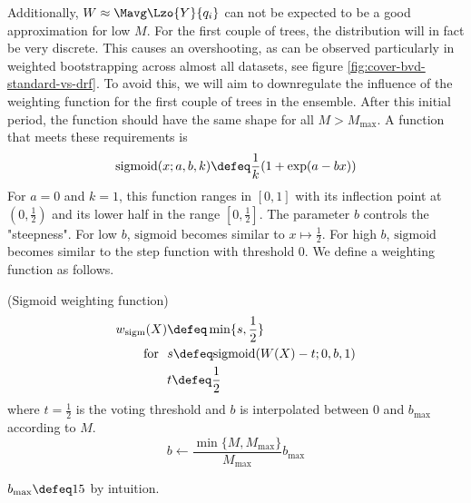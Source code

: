 \documentclass[../main.tex]{subfiles}
\begin{document}
Additionally, $W \approx \Mavg\Lzo{Y}{q_{i}}$ can not be expected to be a good approximation for low $M$. For the first couple of trees, the distribution will in fact be very discrete. This causes an overshooting, as can be observed particularly in weighted bootstrapping across almost all datasets, see figure \ref{fig:cover-bvd-standard-vs-drf}. To avoid this, we will aim to downregulate the influence of the weighting function for the first couple of trees in the ensemble. After this initial period, the function should have the same shape for all $M > M_{\text{max}}$.
A function that meets these requirements is
$$
\text{sigmoid}(x;a,b,k) \defeq \frac{1}{k} (1 + \exp(a-bx))
$$
For $a=0$ and $k=1$, this function ranges in $[0,1]$ with its inflection point at $(0, \frac{1}{2})$ and its lower half in the range $[0, \frac{1}{2}]$. The parameter $b$ controls the "steepness". For low $b$, $\text{sigmoid}$ becomes similar to $x \mapsto \frac{1}{2}$. For high $b$, $\text{sigmoid}$ becomes similar to the step function with threshold $0$.
We define a weighting function as follows.
\begin{definition} (Sigmoid weighting function)
\begin{align*}
w_{\text{sigm} }(X) &\defeq \min\{ s, \frac{1}{2} \} \\
\text{for}~ ~ & s \defeq \text{sigmoid}(W(X) - t; 0, b, 1) \\
 & t \defeq \frac{1}{2}
\end{align*}
where $t = \frac{1}{2}$ is the voting threshold and $b$ is interpolated between $0$ and $b_{\text{max}}$ according to $M$.
$$
b \gets \frac{\min \{ M, M_{\text{max}} \}}{M_{\text{max} }} b_{\text{max} }
$$
\end{definition}
$b_{\text{max}} \defeq 15$ by intuition.

\end{document}
